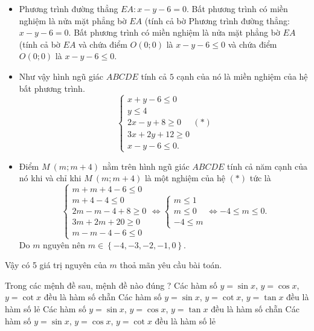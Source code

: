 \begin{bt}
{\begin{itemize}
		\item Phương trình đường thẳng $EA \colon x-y-6=0$. Bất phương trình có miền nghiệm là nửa mặt phẳng bờ $EA$ (tính cả bờ Phương trình đường thẳng: $x-y-6=0$. Bất phương trình có miền nghiệm là nửa mặt phẳng bờ $EA$ (tính cả bờ $EA$ và chứa điểm $O(0;0)$ là $x-y-6\le 0$ và chứa điểm $O(0;0)$ là $x-y-6\le 0$.
		\item Như vậy hình ngũ giác $ABCDE$ tính cả $5$ cạnh của nó là miền nghiệm của hệ bất phương trình.
		\[\left\{\begin{array}{l}
			{x+y-6\le 0} \\
			{y\le 4} \\
			{2x-y+8\ge 0} \\
			{3x+2y+12\ge 0} \\
			{x-y-6\le 0.} 
		\end{array}\right. (*)\] 
		\item Điểm $M\ (m;m+4)$ nằm trên hình ngũ giác $ABCDE$ tính cả năm cạnh của nó khi và chỉ khi $M\ (m;m+4)$ là một nghiệm của hệ $(*)$ tức là \[\left\{\begin{array}{l}
			{m+m+4-6\le 0} \\
			{m+4-4\le 0} \\
			{2m-m-4+8\ge 0} \\
			{3m+2m+20\ge 0} \\
			{m-m-4-6\le 0} 
		\end{array}\right. 
		\Leftrightarrow \left\{\begin{array}{l}
			{m\le 1} \\
			{m\le 0} \\
			{-4\le m} 
		\end{array}\right. 
		\Leftrightarrow-4\le m\le 0.\] 
		Do $m$ nguyên nên $m\in \left\{-4,-3,-2,-1{,}0\right\}$.
	\end{itemize}
		Vậy có 5 giá trị nguyên của $m$ thoả mãn yêu cầu bài toán.
	}
\end{bt}

\begin{ex}%
	Trong các mệnh đề sau, mệnh đề nào  đúng ?
	\choice 
		{Các hàm số $y=\sin x$, $ y=\cos x$, $y=\cot x$  đều là hàm số chẵn}
		{\True Các hàm số $y=\sin x$, $y=\cot x$, $y=\tan  x$ đều là hàm số lẻ}
		 {Các hàm số $y=\sin x$, $y=\cos x$, $y=\tan x$ đều là hàm số chẵn}
		{Các hàm số $y=\sin x$, $y=\cos x$, $y=\cot x$ đều là hàm số lẻ} 
\end{ex}

